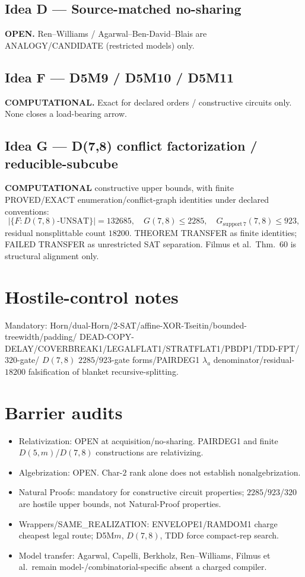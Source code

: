 \documentclass[11pt]{article}
\begin{document}
\subsection*{Idea D --- Source-matched no-sharing}
\textbf{OPEN.} Ren--Williams / Agarwal--Ben-David--Blais are ANALOGY/CANDIDATE
(restricted models) only.

\subsection*{Idea F --- D5M9 / D5M10 / D5M11}
\textbf{COMPUTATIONAL.} Exact for declared orders / constructive circuits only.
None closes a load-bearing arrow.

\subsection*{Idea G --- D(7,8) conflict factorization / reducible-subcube}
\textbf{COMPUTATIONAL} constructive upper bounds, with finite PROVED/EXACT
enumeration/conflict-graph identities under declared conventions:
\[
|\{F:D(7,8)\text{-UNSAT}\}|=132685,\quad
G(7,8)\le 2285,\quad
G_{\mathrm{support}\,7}(7,8)\le 923,
\]
residual nonsplittable count $18200$. THEOREM TRANSFER as finite identities;
FAILED TRANSFER as unrestricted SAT separation. Filmus et al.\ Thm.~60 is
structural alignment only.

\section*{Hostile-control notes}
Mandatory: Horn/dual-Horn/2-SAT/affine-XOR-Tseitin/bounded-treewidth/padding/
DEAD-COPY-DELAY/COVERBREAK1/LEGALFLAT1/STRATFLAT1/PBDP1/TDD-FPT/$320$-gate/
$D(7,8)$ $2285$/$923$-gate forms/PAIRDEG1 $\lambda_a$ denominator/residual-$18200$
falsification of blanket recursive-splitting.

\section*{Barrier audits}
\begin{itemize}
\item Relativization: OPEN at acquisition/no-sharing. PAIRDEG1 and finite
$D(5,m)$/$D(7,8)$ constructions are relativizing.
\item Algebrization: OPEN. Char-$2$ rank alone does not establish nonalgebrization.
\item Natural Proofs: mandatory for constructive circuit properties; $2285$/$923$/$320$
are hostile upper bounds, not Natural-Proof properties.
\item Wrappers/SAME\_REALIZATION: ENVELOPE1/RAMDOM1 charge cheapest legal route;
D5M$m$, $D(7,8)$, TDD force compact-rep search.
\item Model transfer: Agarwal, Capelli, Berkholz, Ren--Williams, Filmus et al.\ remain
model-/combinatorial-specific absent a charged compiler.
\end{itemize}
\end{document}
